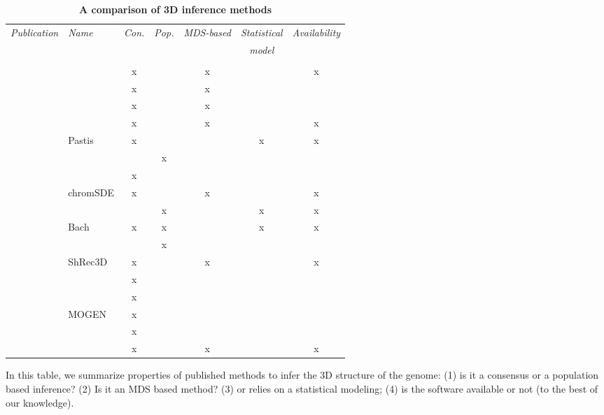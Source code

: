 \documentclass[letterpaper,12pt]{article}
\begin{document}
\begin{table}[ht!]
\begin{center}
\footnotesize
\begin{tabular}{rlccccc}
\hline
\multirow{2}{*}{\emph{\footnotesize Publication}} & \multirow{2}{*}{\emph{\footnotesize Name}} &
\multirow{2}{*}{\emph{\footnotesize Con.}} &
\multirow{2}{*}{\emph{\footnotesize Pop.}}
&\multirow{2}{*}{\emph{\footnotesize MDS-based}} & \emph{\footnotesize Statistical} &
\multirow{2}{*}{\emph{\footnotesize Availability}} \\
& & & & & \emph{\footnotesize model} & \\
\hline
\hline
\footnotesize{\cite{dekker:capturing}} & & & & & & \\
\footnotesize{\cite{duan:three-dimensional}} &  & x & & x & & x \\
\footnotesize{\cite{tanizawa:mapping}} & & x & & x & & \\
\footnotesize{\cite{ay:three-dimensional}} & & x & & x & & \\
\footnotesize{\cite{ben-elazar:spatial}} & & x & & x & & x \\
\footnotesize{\cite{varoquaux:statistical}} & Pastis & x & & & x & x\\
\footnotesize{\cite{bau:three-dimensional}} & & & x & & & \\
\footnotesize{\cite{umbarger:three-dimensional}} & & x & & & &\\
\footnotesize{\cite{zhang:inference}} & chromSDE & x & & x & & x\\
\footnotesize{\cite{rousseau:three}} & & & x & & x & x\\
\footnotesize{\cite{hu:bayesian}} & Bach & x & x & & x & x\\
\footnotesize{\cite{kalhor:genome}} & & & x & & &\\
\footnotesize{\cite{lesne:3d}} & ShRec3D & x & & x & & x \\
\footnotesize{\cite{trieu:large}} & & x & & & & \\
\footnotesize{\cite{trieu:3D}} & & x & & & & \\
\footnotesize{\cite{trieu:MOGEN}} & MOGEN & x & & & & \\
\footnotesize{\cite{nagano:single-cell}} & & x & & & & \\
\footnotesize{\cite{paulsen:manifold}} & & x & & x & & x \\
\hline
\end{tabular}
\end{center}
\caption{\bf A comparison of 3D inference methods}{In this table, we summarize
properties of published methods to infer the 3D structure of the genome: (1)
is it a consensus or a population based inference? (2) Is it an MDS based
method? (3) or relies on a statistical modeling; (4) is the software
available or not (to the best of our knowledge).}
\end{table}
\end{document}
